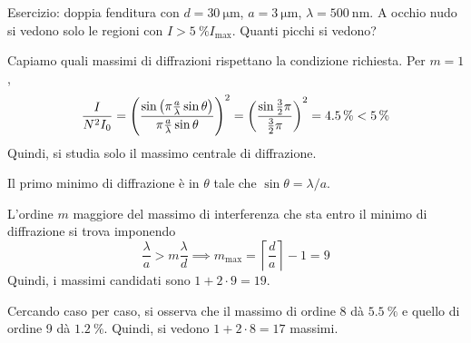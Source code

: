 
Esercizio: doppia fenditura con $d = \qty{30}{\micro\metre}$, $a = \qty{3}{\micro\metre}$, $\lambda = \qty{500}{\nano\metre}$.
A occhio nudo si vedono solo le regioni con $I > \qty{5}{\percent} I_\text{max}$.
Quanti picchi si vedono?

Capiamo quali massimi di diffrazioni rispettano la condizione richiesta.
Per $m = 1$,
\begin{equation}
    \frac{I}{N^2 I_0} = \left( \frac{\sin\left( \pi \frac{a}{\lambda} \sin\theta \right)}{\pi \frac{a}{\lambda} \sin\theta} \right)^2
    = \left( \frac{\sin \frac{3}{2} \pi}{\frac{3}{2} \pi} \right)^2
    = \qty{4.5}{\percent} < \qty{5}{\percent}
\end{equation}
Quindi, si studia solo il massimo centrale di diffrazione.

Il primo minimo di diffrazione è in $\theta$ tale che $\sin \theta = \lambda / a$.

L'ordine $m$ maggiore del massimo di interferenza che sta entro il minimo di diffrazione si trova imponendo
\begin{equation}
    \frac{\lambda}{a} > m \frac{\lambda}{d}
    \implies
    m_\text{max} = \left\lceil \frac{d}{a} \right\rceil - 1 = 9
\end{equation}
Quindi, i massimi candidati sono $1 + 2 \cdot 9 = 19$.

Cercando caso per caso, si osserva che il massimo di ordine 8 dà $\qty{5.5}{\percent}$ e quello di ordine 9 dà $\qty{1.2}{\percent}$.
Quindi, si vedono $1 + 2 \cdot 8 = 17$ massimi.
